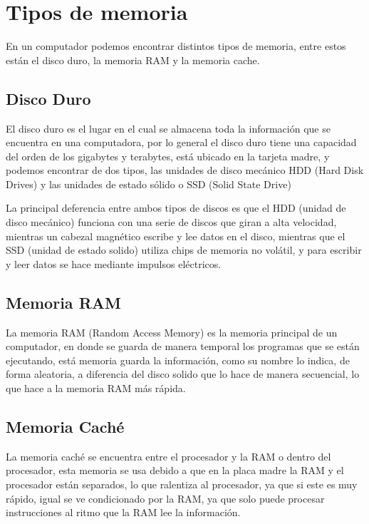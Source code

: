 \documentclass{article}
\begin{document}
\section{Tipos de memoria} \label{contenido}
En un computador podemos encontrar distintos tipos de memoria, entre estos están el disco duro, la memoria RAM y la memoria cache.

\subsection{Disco Duro}
El disco duro es el lugar en el cual se almacena toda la información que se encuentra en una computadora, por lo general el disco duro tiene una capacidad del orden de los gigabytes y terabytes, está ubicado en la tarjeta madre, y podemos encontrar de dos tipos, las unidades de disco mecánico HDD (Hard Disk Drives) y las unidades de estado sólido o SSD (Solid State Drive)
\vspace{0.5cm}

La principal deferencia entre ambos tipos de discos es que el HDD (unidad de disco mecánico) funciona con una serie de discos que giran a alta velocidad, mientras un cabezal magnético escribe y lee datos en el disco, mientras que el SSD (unidad de estado solido) utiliza chips de memoria no volátil, y para escribir y leer datos se hace mediante impulsos eléctricos.\cite{andres2017cual} 

\subsection{Memoria RAM}
La memoria RAM (Random Access Memory) es la memoria principal de un computador, en donde se guarda de manera temporal los programas que se están ejecutando, está memoria  guarda la información, como su nombre lo indica, de forma aleatoria, a diferencia del disco solido que lo hace de manera secuencial, lo que hace a la memoria RAM más rápida.\cite{rebollo2011memoria}

\subsection{Memoria Caché}
La memoria caché se encuentra entre el procesador y la RAM o dentro del procesador, esta memoria se usa debido a que en la placa madre la RAM y el procesador están separados, lo que ralentiza al procesador, ya que si este es muy rápido, igual se ve condicionado por la RAM, ya que solo puede procesar instrucciones al ritmo que la RAM lee la información.
\vspace{0.5cm}
\end{document}
